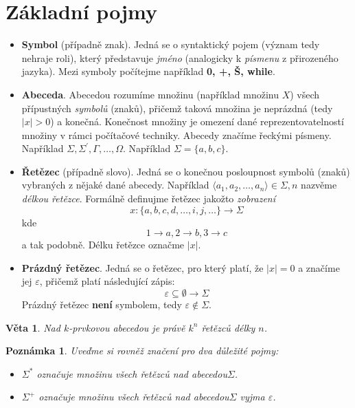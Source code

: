 \documentclass[10pt, a4paper, titlepage]{article}
\theoremstyle{note}
\newtheorem{veta}{\textbf{Věta}}
\newtheorem{poznamka}{\textbf{Poznámka}}
\begin{document}
\section{Základní pojmy}
\begin{itemize}
\item
\textbf{Symbol} (případně znak). Jedná se o syntaktický pojem (význam tedy nehraje roli), který představuje \emph{jméno} (analogicky k \emph{písmenu} z přirozeného jazyka).
Mezi symboly počítejme například \textbf{0, +, Š, while}.

\item
\textbf{Abeceda}. Abecedou rozumíme množinu (například množinu $X$) všech přípustných \emph{symbolů} (znaků), přičemž taková množina je neprázdná (tedy $|x|>0$) a konečná.
Konečnost množiny je omezení dané reprezentovatelností množiny v rámci počítačové techniky.
Abecedy značíme řeckými písmeny. Například $\Sigma, \Sigma^{'}, \Gamma, \ldots, \Omega$.
Například $\Sigma = \lbrace a, b, c \rbrace$.

\item
\textbf{Řetězec} (případně slovo). Jedná se o konečnou posloupnost symbolů (znaků) vybraných z nějaké dané abecedy.
Například $\langle a_{1}, a_{2}, \ldots, a_{n} \rangle \in \Sigma, n$ nazvěme \emph{délkou řetězce}.
Formálně definujme řetězec jakožto \emph{zobrazení}
$$
x : \lbrace a, b, c, d, \ldots, i, j, \ldots \rbrace \rightarrow \Sigma
$$
kde
$$
1 \rightarrow a, 2 \rightarrow b, 3 \rightarrow c
$$ a tak podobně.
Délku řetězce označme $|x|$.

\item
\textbf{Prázdný řetězec}. Jedná se o řetězec, pro který platí, že $|x| = 0$ a značíme jej $\varepsilon$, přičemž platí následující zápis:
$$
\varepsilon \subseteq \emptyset \rightarrow \Sigma
$$
Prázdný řetězec \textbf{není} symbolem, tedy $\varepsilon \notin \Sigma$.
\end{itemize}

\begin{veta}
Nad $k$-prvkovou abecedou je právě $k^{n}$ řetězců délky $n$.
\end{veta}


\begin{poznamka}
Uveďme si rovněž značení pro dva důležité pojmy:

\begin{itemize}
\item
$\Sigma^{*}$ označuje množinu všech řetězců nad abecedou$\Sigma$.

\item
$\Sigma^{+}$ označuje množinu všech řetězců nad abecedou$\Sigma$ vyjma $\varepsilon$.
\end{itemize}
\end{poznamka}
\end{document}

